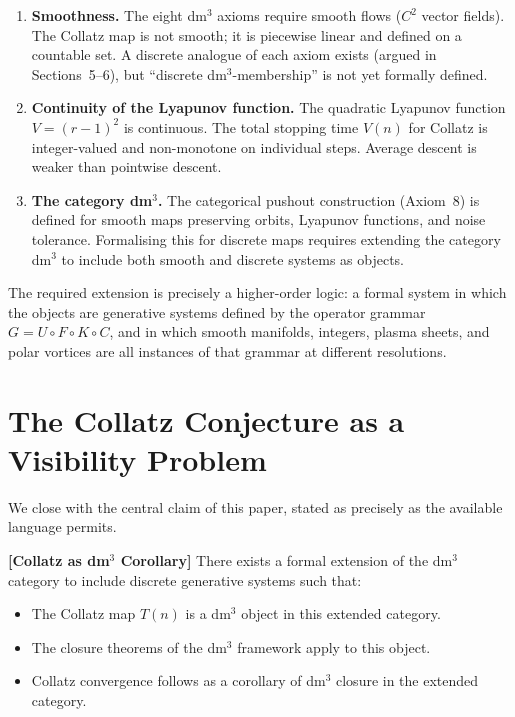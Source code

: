 \documentclass[11pt]{article}
\begin{document}
\begin{enumerate}
  \item \textbf{Smoothness.} The eight dm$^3$ axioms require smooth flows ($C^2$ vector fields).
    The Collatz map is not smooth; it is piecewise linear and defined on a countable set. A discrete
    analogue of each axiom exists (argued in Sections~5--6), but ``discrete dm$^3$-membership'' is
    not yet formally defined.
  \item \textbf{Continuity of the Lyapunov function.} The quadratic Lyapunov function $V = (r-1)^2$
    is continuous. The total stopping time $V(n)$ for Collatz is integer-valued and non-monotone on
    individual steps. Average descent is weaker than pointwise descent.
  \item \textbf{The category dm$^3$.} The categorical pushout construction (Axiom~8) is defined for
    smooth maps preserving orbits, Lyapunov functions, and noise tolerance. Formalising this for
    discrete maps requires extending the category dm$^3$ to include both smooth and discrete systems
    as objects.
\end{enumerate}

The required extension is precisely a higher-order logic: a formal system in which the objects are
generative systems defined by the operator grammar $G = U \circ F \circ K \circ C$, and in which
smooth manifolds, integers, plasma sheets, and polar vortices are all instances of that grammar at
different resolutions.

\section{The Collatz Conjecture as a Visibility Problem}

We close with the central claim of this paper, stated as precisely as the available language
permits.

\noindent\textbf{[Collatz as dm$^3$ Corollary]} There exists a formal extension of the dm$^3$
category to include discrete generative systems such that:
\begin{itemize}
  \item[(i)] The Collatz map $T(n)$ is a dm$^3$ object in this extended category.
  \item[(ii)] The closure theorems of the dm$^3$ framework apply to this object.
  \item[(iii)] Collatz convergence follows as a corollary of dm$^3$ closure in the extended
    category.
\end{itemize}
\end{document}
